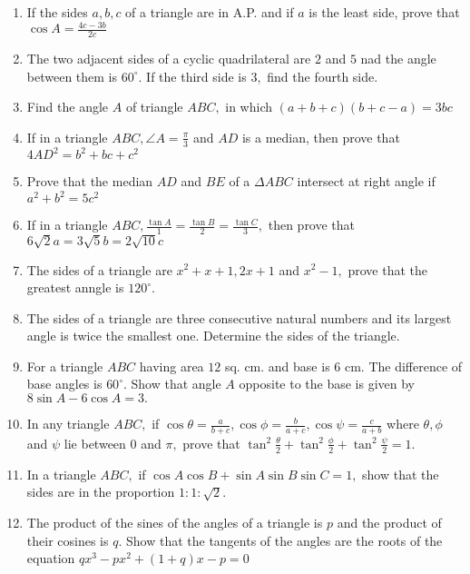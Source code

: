 \begin{enumerate}
\item If the sides $a, b, c$ of a triangle are in A.P. and if $a$ is the least side, prove that $\cos A =
    \frac{4c - 3b}{2c}$

\item The two adjacent sides of a cyclic quadrilateral are $2$ and $5$ nad the angle between them is $60^\circ.$ If
    the third side is $3,$ find the fourth side.

\item Find the angle $A$ of triangle $ABC,$ in which $(a + b + c)(b + c - a) = 3bc$

\item If in a triangle $ABC, \angle A = \frac{\pi}{3}$ and $AD$ is a median, then prove that $4AD^2 = b^2 + bc +
    c^2$

\item Prove that the median $AD$ and $BE$ of a $\Delta ABC$ intersect at right angle if $a^2 + b^2 = 5c^2$

\item If in a triangle $ABC, \frac{\tan A}{1} = \frac{\tan B}{2} = \frac{\tan C}{3},$ then prove that $6\sqrt{2}a =
    3\sqrt{5}b = 2\sqrt{10}c$

\item The sides of a triangle are $x^2 + x + 1, 2x + 1$ and $x^2 - 1,$ prove that the greatest anngle is $120^\circ.$

\item The sides of a triangle are three consecutive natural numbers and its largest angle is twice the smallest one. Determine the
    sides of the triangle.

\item For a triangle $ABC$ having area $12$ sq. cm. and base is $6$ cm. The difference of base angles is
    $60^\circ.$ Show that angle $A$ opposite to the base is given by $8\sin A - 6\cos A = 3.$

\item In any triangle $ABC,$ if $\cos\theta = \frac{a}{b + c}, \cos\phi = \frac{b}{a + c}, \cos\psi = \frac{c}{a +
    b}$ where $\theta, \phi$ and $\psi$ lie between $0$ and $\pi,$ prove that
    $\tan^2\frac{\theta}{2} + \tan^2\frac{\phi}{2} + \tan^2\frac{\psi}{2} = 1.$

\item In a triangle $ABC,$ if $\cos A\cos B + \sin A\sin B\sin C = 1,$ show that the sides are in the proportion
    $1:1:\sqrt{2}.$

\item The product of the sines of the angles of a triangle is $p$ and the product of their cosines is $q.$ Show that the
    tangents of the angles are the roots of the equation $qx^3 - px^2 + (1 + q)x - p = 0$


\end{enumerate}
